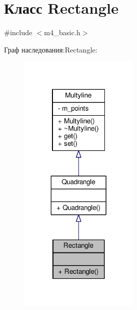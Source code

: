 \hypertarget{class_rectangle}{\section{Класс Rectangle}
\label{class_rectangle}
}


{\ttfamily \#include $<$m4\-\_\-basic.\-h$>$}



Граф наследования\-:Rectangle\-:
\nopagebreak
\begin{figure}[H]
\begin{center}
\leavevmode
\includegraphics[width=160pt]{class_rectangle__inherit__graph}
\end{center}
\end{figure}


